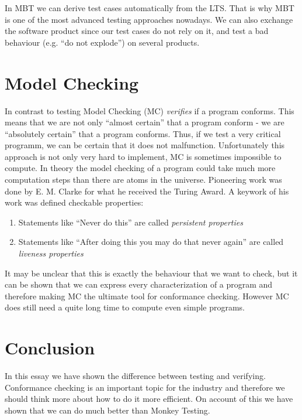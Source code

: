 \documentclass[a4paper, 12pt]{article} %
\begin{document}
In MBT we can derive test cases automatically from the LTS. That is why MBT
is one of the most advanced testing approaches nowadays. We can also exchange
the software product since our test cases do not rely on it, and test a bad
behaviour (e.g. ``do not explode'') on several products. 

\section*{Model Checking}
In contrast to testing Model Checking (MC) \textit{verifies} if a program
conforms. This means that we are not only ``almost certain'' that a program
conform - we are ``absolutely certain'' that a program conforms. Thus, if we
test a very critical programm, we can be certain that it does not malfunction.
Unfortunately this approach is not only very hard to implement, MC is sometimes
impossible to compute. In theory the model checking of a program could take much
more computation steps than there are atoms in the universe. Pioneering work was
done by E. M. Clarke for what he received the Turing Award. A keywork of
his work was defined checkable properties:
\begin{enumerate}
  \item Statements like ``Never do {\color{red}this}'' are called
  \textit{persistent properties}
  \item Statements like ``After doing {\color{red}this} you may do
  {\color{blue}that} never again'' are called \textit{liveness properties}
\end{enumerate}

It may be unclear that this is exactly the behaviour that we want to check, but
it can be shown that we can express every characterization of a program and
therefore making MC the ultimate tool for conformance checking. However MC does
still need a quite long time to compute even simple programs. 


\section*{Conclusion}
In this essay we have shown the difference between testing and verifying. 
Conformance checking is an important topic for the industry and therefore we
should think more about how to do it more efficient. On account of this we have
shown that we can do much better than Monkey Testing.





\end{document}
